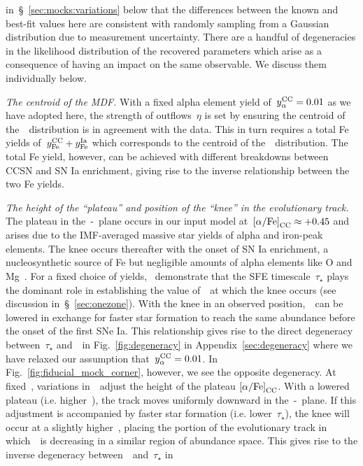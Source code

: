 \documentclass[ms.tex]{subfiles}
\begin{document}
in~\S~\ref{sec:mocks:variations} below that the differences between the known
and best-fit values here are consistent with randomly sampling from a Gaussian
distribution due to measurement uncertainty.
There are a handful of degeneracies in the likelihood distribution of the
recovered parameters which arise as a consequence of having an impact on the
same observable.
We discuss them individually below.
\par
\textit{The centroid of the MDF.}
With a fixed alpha element yield of~$y_\alpha^\text{CC} = 0.01$ as we have adopted here,
the strength of outflows~$\eta$ is set by ensuring the centroid of
the~\ah~distribution is in agreement with the data.
This in turn requires a total Fe yields of~$y_\text{Fe}^\text{CC} + y_\text{Fe}^\text{Ia}$ which corresponds
to the centroid of the~\feh~distribution.
The total Fe yield, however, can be achieved with different breakdowns between
CCSN and SN Ia enrichment, giving rise to the inverse relationship
between the two Fe yields.
\par
\textit{The height of the ``plateau'' and position of the ``knee'' in the
evolutionary track.}
The plateau in the~\afe-\feh~plane occurs in our input model
at~$\text{[$\alpha$/Fe]}_\text{CC} \approx +0.45$ and arises due to the IMF-averaged
massive star yields of alpha and iron-peak elements.
The knee occurs thereafter with the onset of SN Ia enrichment, a
nucleosynthetic source of Fe but negligible amounts of alpha elements like O
and Mg~\citep{Johnson2019}.
For a fixed choice of yields,~\citet{Weinberg2017} demonstrate that the SFE
timescale~$\tau_\star$ plays the dominant role in establishing the value
of~\feh~at which the knee occurs (see discussion in~\S~\ref{sec:onezone}).
With the knee in an observed position,~\yfecc~can be lowered in exchange for
faster star formation to reach the same abundance before the onset of the
first SNe Ia.
This relationship gives rise to the direct degeneracy between~$\tau_\star$
and~\yfecc~in Fig.~\ref{fig:degeneracy} in Appendix~\ref{sec:degeneracy} where
we have relaxed our assumption that~$y_\alpha^\text{CC} = 0.01$.
In Fig.~\ref{fig:fiducial_mock_corner}, however, we see the opposite
degeneracy.
At fixed~\yacc, variations in~\yfecc~adjust the height of the plateau
$\text{[$\alpha$/Fe]}_\text{CC}$.
With a lowered plateau (i.e. higher~\yfecc), the track moves uniformly downward
in the~\afe-\feh~plane.
If this adjustment is accompanied by faster star formation (i.e.
lower~$\tau_\star$), the knee will occur at a slightly higher~\feh, placing the
portion of the evolutionary track in which~\afe~is decreasing in a similar
region of abundance space.
This gives rise to the inverse degeneracy between~\yfecc~and~$\tau_\star$ in
\end{document}
